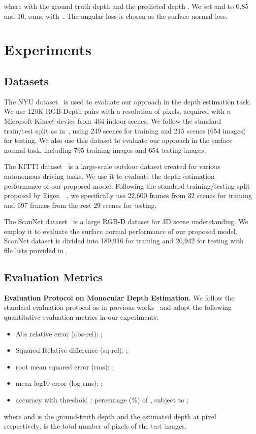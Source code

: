 \documentclass[10pt,twocolumn,letterpaper]{article}
\begin{document}
where  with the ground truth depth  and the predicted depth .
We set  and  to 0.85 and 10,
same with~\cite{lee2019big}. The angular loss is chosen as the surface normal loss.  \section{Experiments}
\subsection{Datasets}
The NYU dataset~\cite{silberman2012indoor} is used to evaluate our approach in the depth estimation task. We use 120K RGB-Depth pairs with a resolution of  pixels, acquired with a Microsoft Kinect device from 464 indoor scenes. We follow the standard train/test split as in~\cite{eigen2014depth}, using 249 scenes for training and 215 scenes (654 images) for testing. We also use this dataset to evaluate our approach in the surface normal task, including 795 training images and 654 testing images.

The KITTI dataset~\cite{Geiger2013IJRR} is a large-scale outdoor dataset created for various autonomous driving tasks. We use it to evaluate the depth estimation performance of our proposed model. Following the standard training/testing split proposed by Eigen~\etal~\cite{eigen2014depth}, we specifically use 22,600 frames from 32 scenes for training and 697 frames from the rest 29 scenes for testing.

The ScanNet dataset~\cite{dai2017scannet} is a large RGB-D dataset for 3D scene understanding. We employ it to evaluate the surface normal performance of our proposed model. ScanNet dataset is divided into 189,916 for training and 20,942 for testing with file lists provided in \cite{dai2017scannet}.

\subsection{Evaluation Metrics}
\par\noindent\textbf{Evaluation Protocol on Monocular Depth Estimation.}
We follow the standard evaluation protocol as in previous works~\cite{eigen2015predicting,eigen2014depth,wang2015towards} and adopt the following quantitative evaluation metrics in our experiments: 
\begin{itemize}[leftmargin=*]
\item Abs relative error (abs-rel): 
; 
\item Squared Relative difference (sq-rel):
; 
\item root mean squared error (rms): 
;
\item mean log10 error (log-rms): 
;
\item accuracy with threshold : percentage (\%) of , subject to ;
\end{itemize}
where  and  is the ground-truth depth and the estimated depth at pixel  respectively;  is the total number of pixels of the test images.
\end{document}

